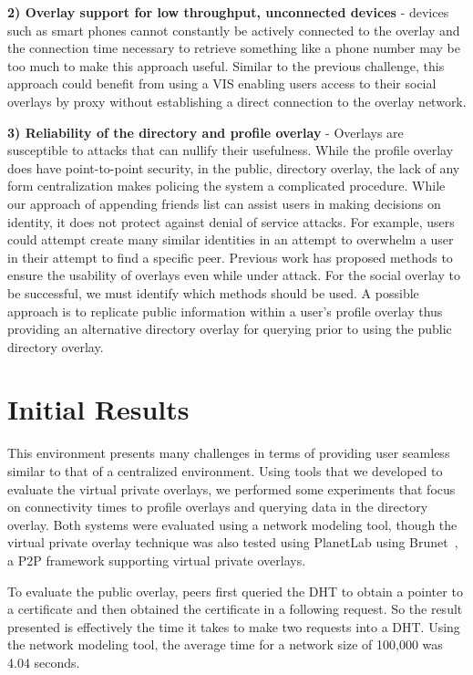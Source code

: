 \documentclass[conference]{IEEEtran}
\begin{document}
{\bf 2) Overlay support for low throughput, unconnected devices} - devices such
as smart phones cannot constantly be actively connected to the overlay and the
connection time necessary to retrieve something like a phone number may be too
much to make this approach useful.  Similar to the previous challenge, this
approach could benefit from using a VIS enabling users access to their social
overlays by proxy without establishing a direct connection to the overlay
network.

{\bf 3) Reliability of the directory and profile overlay} - Overlays are
susceptible to attacks that can nullify their usefulness.  While the profile
overlay does have point-to-point security, in the public, directory overlay,
the lack of any form centralization makes policing the system a complicated
procedure.  While our approach of appending friends list can assist users in
making decisions on identity, it does not protect against denial of service
attacks.  For example, users could attempt create many similar identities in
an attempt to overwhelm a user in their attempt to find a specific peer.
Previous work has proposed methods to ensure the usability of overlays even
while under attack.  For the social overlay to be successful, we must identify
which methods should be used. A possible approach is to replicate public
information within a user's profile overlay thus providing an alternative
directory overlay for querying prior to using the public directory overlay.

\section{Initial Results}
\label{experiments}

This environment presents many challenges in terms of providing user seamless
similar to that of a centralized environment.  Using tools that we developed
to evaluate the virtual private overlays, we performed some experiments that
focus on connectivity times to profile overlays and querying data in the
directory overlay.  Both systems were evaluated using a network modeling tool,
though the virtual private overlay technique was also tested using PlanetLab
using Brunet~\cite{brunet}, a P2P framework supporting virtual private overlays.

To evaluate the public overlay, peers first queried the DHT to obtain a pointer
to a certificate and then obtained the certificate in a following request.  So
the result presented is effectively the time it takes to make two requests into
a DHT.  Using the network modeling tool, the average time for a network size of
100,000 was 4.04 seconds.
\end{document}

